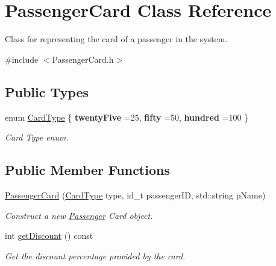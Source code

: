 \hypertarget{classPassengerCard}{}\section{Passenger\+Card Class Reference}
\label{classPassengerCard}


Class for representing the card of a passenger in the system.  




{\ttfamily \#include $<$Passenger\+Card.\+h$>$}

\subsection*{Public Types}
\begin{DoxyCompactItemize}
\item 
\mbox{\label{classPassengerCard_ac30388c823af514403463a797e2878af}} 
enum \mbox{\hyperlink{classPassengerCard_ac30388c823af514403463a797e2878af}{Card\+Type}} \{ {\bfseries twenty\+Five} =25, 
{\bfseries fifty} =50, 
{\bfseries hundred} =100
 \}
\begin{DoxyCompactList}\small\item\em Card Type enum. \end{DoxyCompactList}\end{DoxyCompactItemize}
\subsection*{Public Member Functions}
\begin{DoxyCompactItemize}
\item 
\mbox{\hyperlink{classPassengerCard_a1ebc730da7c0820350024f29c37ce9d9}{Passenger\+Card}} (\mbox{\hyperlink{classPassengerCard_ac30388c823af514403463a797e2878af}{Card\+Type}} type, id\+\_\+t passenger\+ID, std\+::string p\+Name)
\begin{DoxyCompactList}\small\item\em Construct a new \mbox{\hyperlink{classPassenger}{Passenger}} Card object. \end{DoxyCompactList}\item 
int \mbox{\hyperlink{classPassengerCard_a62d2651d233d28643d5e0863500c42c4}{get\+Discount}} () const
\begin{DoxyCompactList}\small\item\em Get the discount percentage provided by the card. \end{DoxyCompactList}\end{DoxyCompactItemize}
